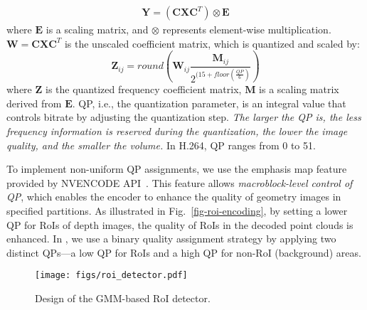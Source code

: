 \vspace{-0.4cm}
\begin{align*}
    \mathbf{Y}=(\mathbf{C}\mathbf{X}\mathbf{C}^T)\otimes\mathbf{E}
\label{eq-dct-1}
\end{align*}
where $\mathbf{E}$ is a scaling matrix, and $\otimes$ represents element-wise multiplication. $\mathbf{W}=\mathbf{C}\mathbf{X}\mathbf{C}^T$ is the unscaled coefficient matrix, which is quantized and scaled by:
\begin{equation}
\mathbf{Z}_{ij}=round\left(\mathbf{W}_{ij}\frac{\mathbf{M}_{ij}}{2^{(15+floor(\frac{QP}{6})}}\right)
\label{eq-dct-1}
\end{equation}
where $\mathbf{Z}$ is the quantized frequency coefficient matrix, $\mathbf{M}$ is a scaling matrix derived from $\mathbf{E}$. QP, i.e., the quantization parameter, is an integral value that controls bitrate by adjusting the quantization step. \textit{The larger the QP is, the less frequency information is reserved during the quantization, the lower the image quality, and the smaller the volume.} In H.264, QP ranges from 0 to 51.

To implement non-uniform QP assignments, we use the emphasis map feature provided by NVENCODE API~\cite{NVENCVideoEncoder}. This feature allows \textit{macroblock-level control of QP}, which enables the encoder to enhance the quality of geometry images in specified partitions. As illustrated in Fig.~\ref{fig-roi-encoding}, by setting a lower QP for RoIs of depth images, the quality of RoIs in the decoded point clouds is enhanced. In \methodname{}, we use a binary quality assignment strategy by applying two distinct QPs—a low QP for RoIs and a high QP for non-RoI (background) areas.

\begin{figure*}[ht]
\setlength{\abovecaptionskip}{0.2cm}
\setlength{\belowcaptionskip}{-0.2cm}
  \centering
    \texttt{[image: figs/roi\_detector.pdf]}
  \caption{Design of the GMM-based RoI detector.}
  \label{fig-roi-detector}
\end{figure*}

